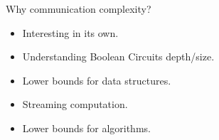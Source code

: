 \begin{frame}{Why communication complexity?}

    \pause
    \begin{itemize}
        \item Interesting in its own.
            \pause
        \item Understanding Boolean Circuits depth/size.
            \pause
        \item Lower bounds for data structures.
            \pause
        \item Streaming computation.
            \pause
        \item Lower bounds for algorithms.
    \end{itemize}
\end{frame}